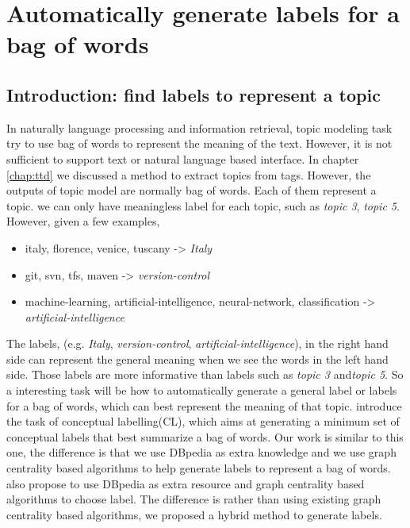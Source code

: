 \chapter{Automatically generate labels for a bag of words}
\doublespacing
\label{chap:label}
\minitoc



\section{Introduction: find labels to represent a topic}
In naturally language processing and information retrieval, topic modeling task try to use bag of words to represent the meaning of the text. However, it is not sufficient to support text or natural language based interface. In chapter \ref{chap:ttd} we discussed a method to extract topics from tags. However, the outputs of topic model are normally bag of words. Each of them represent a topic. we can only have meaningless label for each topic, such as \textit{topic 3}, \textit{topic 5}. However, given a few examples, 
\begin{itemize}
    \item {italy, florence, venice, tuscany -> \textit{Italy}}
    \item {git, svn, tfs, maven -> \textit{version-control}}
    \item {machine-learning, artificial-intelligence, neural-network, classification -> \textit{artificial-intelligence}}
\end{itemize}
The labels, (e.g. \textit{Italy}, \textit{version-control}, \textit{artificial-intelligence}), in the right hand side can represent the general meaning when we see the words in the left hand side. Those labels are more informative than labels such as \textit{topic 3} and\textit{topic 5}. So a interesting task will be how to automatically generate a general label or labels for a bag of words, which can best represent the meaning of that topic. \cite{chp6OnConceptualLabelingOfBagOfWords} introduce the task of conceptual labelling(CL), which aims at generating a minimum set of conceptual labels that best summarize a bag of words. Our work is similar to this one, the difference is that we use DBpedia as extra knowledge and we use graph centrality based algorithms to help generate labels to represent a bag of words. \cite{chp2hulpus2013unsupervisedtopiclabeling} also propose to use DBpedia as extra resource and graph centrality based algorithms to choose label. The difference is rather than using existing graph centrality based algorithms, we proposed a hybrid method to generate labels. 



